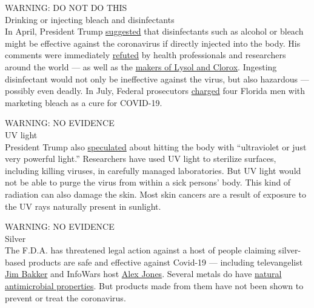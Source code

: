 WARNING: DO NOT DO THIS\\
Drinking or injecting bleach and disinfectants\\
In April, President Trump
\href{https://www.nytimes3xbfgragh.onion/2020/04/24/health/sunlight-coronavirus-trump.html}{suggested}
that disinfectants such as alcohol or bleach might be effective against
the coronavirus if directly injected into the body. His comments were
immediately
\href{https://www.nytimes3xbfgragh.onion/2020/04/24/us/politics/trump-inject-disinfectant-bleach-coronavirus.html}{refuted}
by health professionals and researchers around the world --- as well as
the
\href{https://www.prweek.com/article/1681380/lysol-clorox-respond-trump-comment-injecting-disinfectant}{makers
of Lysol and Clorox}. Ingesting disinfectant would not only be
ineffective against the virus, but also hazardous --- possibly even
deadly. In July, Federal prosecutors
\href{https://www.wtsp.com/article/news/regional/florida/miracle-mineral-solution-genesis-ii-church-of-health-and-healing/67-b33b7f2e-2b0c-4853-8434-90732359d730}{charged}
four Florida men with marketing bleach as a cure for COVID-19.

WARNING: NO EVIDENCE\\
UV light\\
President Trump also
\href{https://www.nytimes3xbfgragh.onion/2020/04/24/health/sunlight-coronavirus-trump.html}{speculated}
about hitting the body with ``ultraviolet or just very powerful light.''
Researchers have used UV light to sterilize surfaces, including killing
viruses, in carefully managed laboratories. But UV light would not be
able to purge the virus from within a sick persons' body. This kind of
radiation can also damage the skin. Most skin cancers are a result of
exposure to the UV rays naturally present in sunlight.

WARNING: NO EVIDENCE\\
Silver\\
The F.D.A. has threatened legal action against a host of people claiming
silver-based products are safe and effective against Covid-19 ---
including televangelist
\href{https://www.fda.gov/inspections-compliance-enforcement-and-criminal-investigations/warning-letters/jim-bakker-show-604820-03062020}{Jim
Bakker} and InfoWars host
\href{https://www.fda.gov/inspections-compliance-enforcement-and-criminal-investigations/warning-letters/free-speech-systems-llc-dba-infowarscom-605802-04092020}{Alex
Jones}. Several metals do have
\href{https://www.nytimes3xbfgragh.onion/article/copper-coronavirus-masks.html}{natural
antimicrobial properties}. But products made from them have not been
shown to prevent or treat the coronavirus.

